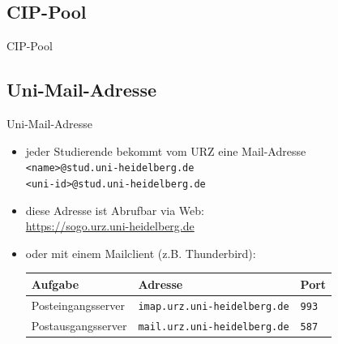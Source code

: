 
\subsection{CIP-Pool}
\begin{frame}{CIP-Pool}
\end{frame}


\subsection{Uni-Mail-Adresse}
\begin{frame}{Uni-Mail-Adresse}
    \begin{itemize}
        \item<+-> jeder Studierende bekommt vom URZ eine Mail-Adresse \\
            \texttt{<name>@stud.uni-heidelberg.de} \\
            \texttt{<uni-id>@stud.uni-heidelberg.de} \\
        \item<+->diese Adresse ist Abrufbar via Web: \\
            \url{https://sogo.urz.uni-heidelberg.de} \\
        \item<+-> oder mit einem Mailclient (z.B. Thunderbird): \\
            \vspace{0.5em}
            \begin{tabular}{lll}
                Aufgabe & Adresse & Port \\ \toprule
                Posteingangsserver & \texttt{imap.urz.uni-heidelberg.de} & \texttt{993} \\
                Postausgangsserver & \texttt{mail.urz.uni-heidelberg.de} & \texttt{587} \\
            \end{tabular}
    \end{itemize}
\end{frame}


